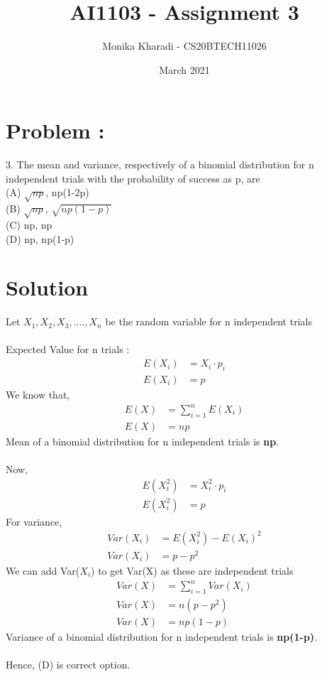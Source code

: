 \documentclass[journal,12pt,two column]{IEEEtran}
\title{AI1103 - Assignment 3}
\author{Monika Kharadi - CS20BTECH11026}
\date{March 2021}
\begin{document}
\maketitle
\section*{\large\textbf{Problem :}}
3. The mean and variance, respectively of a binomial distribution for n independent trials with the probability of success as p, are \\
(A) $\sqrt{np}$, np(1-2p)\\
(B) $\sqrt{np}$, $\sqrt{np(1-p)}$\\
(C) np, np \\
(D) np, np(1-p)
\section*{\large\textbf{Solution}}
Let $X_1,X_2,X_3,....,X_n$ be the random variable for n independent trials \\ \\
Expected Value for n trials : 
\begin{align}
E(X_i) &= X_i\cdot p_i \nonumber\\
E(X_i) &= p
\end{align}
We know that,
\begin{align}
E(X) &= \sum_{i=1}^n E (X_i) \nonumber\\
E(X) &= np
 \end{align}
Mean of a binomial distribution for n independent trials is \textbf{np}.\\ \\
Now,
\begin{align}
E(X_i^2) &= X_i^2\cdot p_i \nonumber\\
E(X_i^2) &= p
\end{align}
For variance,
\begin{align}
    Var(X_i) &= E(X_i^2) - E(X_i)^2 \\
    Var(X_i) &= p - p^2 
    \end{align}
We can add Var($X_i$)  to get Var(X)  as these are independent trials
\begin{align}
Var(X) &= \sum_{i=1}^n Var(X_i) \nonumber \\
Var(X) &= n(p - p^2)\nonumber\\
Var(X) &= np(1-p)
\end{align}
Variance of a binomial distribution for n independent trials is \textbf{np(1-p)}.\\ \\
Hence, (D) is correct option.
\end{document}
